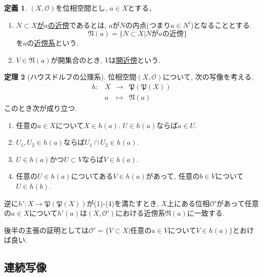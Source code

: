 \documentclass[dvipdfmx,a4paper,11pt]{article}
\theoremstyle{definition}
\newtheorem{thm}{定理}
\newtheorem{dfn}[thm]{定義}
\begin{document}
\begin{tcolorbox}[
    colback = white,
    colframe = green!35!black,
    fonttitle = \bfseries,
    breakable = true]
    \begin{dfn}
$(X, \mathscr{O} )$を位相空間とし, $a \in X$とする．
\begin{enumerate}
\item \underline{$N \subset X$が$a$の近傍}であるとは, $a$が$N$の内点(つまり$a \in N^i$)となることとする.
$$
\mathfrak{N}(a) = \{N \subset X | \text{$N$が$a$の近傍}\}
$$
を$a$の\underline{近傍系}という.
\item $V \in \mathfrak{N}(a)$が開集合のとき, $V$は\underline{開近傍}という.
\end{enumerate}
  \end{dfn}
 \end{tcolorbox}
 
   \begin{tcolorbox}[
    colback = white,
    colframe = green!35!black,
    fonttitle = \bfseries,
    breakable = true]
    \begin{thm}[ハウスドルフの公理系]
    \text{}
位相空間$(X, \mathscr{O} )$について, 次の写像を考える.
   $$
\begin{array}{cccc}
h : &X& \rightarrow & \mathfrak{P}(\mathfrak{P}(X))  \\
&a& \longmapsto &\mathfrak{N}(a)
\end{array}
$$
このとき次が成り立つ.
    \begin{enumerate}
     \setlength{\parskip}{0cm} 
  \setlength{\itemsep}{0cm} 
    \item 任意の$a \in X$について$X \in h(a)$. $U \in h(a)$ならば$a \in U$.
    \item $U_1, U_2 \in h(a)$ならば$U_1 \cap U_2 \in h(a)$.
    \item $U \in h(a)$かつ$U \subset V$ならば$V \in h(a)$.
    \item 任意の$U \in h(a)$についてある$V \in h(a)$があって, 任意の$b \in V$について$U \in h(b)$.
    \end{enumerate}
逆に$h':X \rightarrow \mathfrak{P}(\mathfrak{P}(X)) $が(1)-(4)を満たすとき, $X$上にある位相$\mathscr{O}'$があって任意の$a\in X$について$h'(a)$は$(X, \mathscr{O}')$における近傍系$\mathfrak{N}(a) $に一致する.
  \end{thm}
 \end{tcolorbox}
 後半の主張の証明としては$ \mathscr{O}' = \{ V\subset X | \text{任意の$a \in V$について$V \in h(a)$}  \}$とおけば良い.

\subsection{連続写像}
\end{document}

